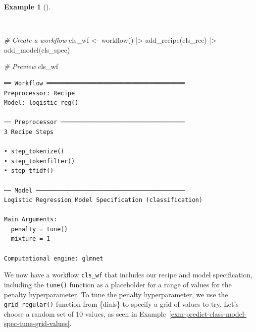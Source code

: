 \documentclass[
  letterpaper,
  krantz1]{latex/krantz-mod}
\newenvironment{Shaded}{\begin{snugshade}}{\end{snugshade}}
\newcommand{\CommentTok}[1]{\textcolor[rgb]{0.00,0.00,0.00}{\textit{#1}}}
\newcommand{\FunctionTok}[1]{\textcolor[rgb]{0.00,0.00,0.00}{#1}}
\newcommand{\NormalTok}[1]{\textcolor[rgb]{0.00,0.00,0.00}{#1}}
\newcommand{\OtherTok}[1]{\textcolor[rgb]{0.00,0.00,0.00}{#1}}
\newcommand{\SpecialCharTok}[1]{\textcolor[rgb]{0.00,0.00,0.00}{#1}}
\theoremstyle{definition}
\newtheorem{example}{Example}[chapter]
\theoremstyle{definition}
\theoremstyle{remark}
\begin{document}
\begin{example}[]\protect\hypertarget{exm-predict-class-workflow}{}\label{exm-predict-class-workflow}

~

\begin{Shaded}
\begin{Highlighting}[numbers=left,,]
\CommentTok{\# Create a workflow}
\NormalTok{cls\_wf }\OtherTok{\textless{}{-}}
  \FunctionTok{workflow}\NormalTok{() }\SpecialCharTok{|\textgreater{}}
  \FunctionTok{add\_recipe}\NormalTok{(cls\_rec) }\SpecialCharTok{|\textgreater{}}
  \FunctionTok{add\_model}\NormalTok{(cls\_spec)}

\CommentTok{\# Preview}
\NormalTok{cls\_wf}
\end{Highlighting}
\end{Shaded}

\begin{verbatim}
══ Workflow ═══════════════════════════════════════
Preprocessor: Recipe
Model: logistic_reg()

── Preprocessor ───────────────────────────────────
3 Recipe Steps

• step_tokenize()
• step_tokenfilter()
• step_tfidf()

── Model ──────────────────────────────────────────
Logistic Regression Model Specification (classification)

Main Arguments:
  penalty = tune()
  mixture = 1

Computational engine: glmnet
\end{verbatim}

\end{example}

We now have a workflow \texttt{cls\_wf} that includes our recipe and
model specification, including the \texttt{tune()} function as a
placeholder for a range of values for the penalty hyperparameter. To
tune the penalty hyperparameter, we use the \texttt{grid\_regular()}
function from \{dials\} to specify a grid of values to try. Let's choose
a random set of 10 values, as seen in
Example~\ref{exm-predict-class-model-spec-tune-grid-values}.
\end{document}
